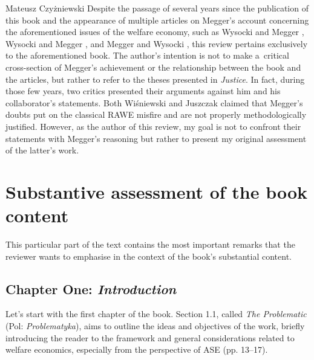 \begin{newrevengenv}{Mateusz Czyżniewski}
Despite the passage of several years since the publication of this book and the appearance of multiple articles on Megger's account concerning the aforementioned issues of the welfare economy, such as Wysocki and Megger 
\parencite*[][]{wysocki_austrian_2019}, %
 Wysocki and Megger 
\parencite*[][]{wysocki_rejoinder_2020}, %
 and Megger and Wysocki 
\parencite*[][]{megger_austriacka_2023}, %
 this review pertains exclusively to the aforementioned book. The author's intention is not to make a~critical cross-section of Megger's achievement or the relationship between the book and the articles, but rather to refer to the theses presented in \textit{Justice}. In fact, during those few years, two critics presented their arguments against him and his collaborator's statements. Both Wiśniewski 
\parencite*[][]{wisniewski_austrian_2019} %
 and Juszczak 
\parencite*[][]{juszczak_o_2021} %
 claimed that Megger's doubts put on the classical RAWE misfire and are not properly methodologically justified. However, as the author of this review, my goal is not to confront their statements with Megger's reasoning but rather to present my original assessment of the latter's work.



\section{Substantive assessment of the book content}

This particular part of the text contains the most important remarks that the reviewer wants to emphasise in the context of the book's substantial content.



\subsection{Chapter One: \textit{Introduction}}



Let's start with the first chapter of the book. Section 1.1, called \textit{The Problematic} (Pol: \textit{Problematyka}), aims to outline the ideas and objectives of the work, briefly introducing the reader to the framework and general considerations related to welfare economics, especially from the perspective of ASE (pp. 13–17).




\end{newrevengenv}
